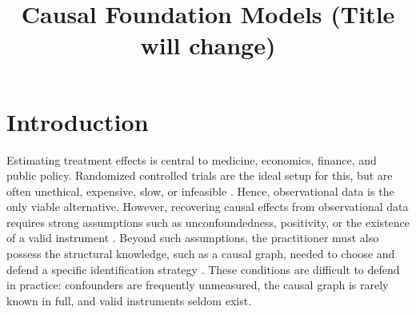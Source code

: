 \documentclass[11pt]{article}
\title{Causal Foundation Models (Title will change)}
\begin{document}
\maketitle

\section{Introduction}





Estimating treatment effects is central to medicine, economics, finance, and public policy. Randomized controlled trials are the ideal setup for this, but are often unethical, expensive, slow, or infeasible \citep{hernan2020}. Hence, observational data is the only viable alternative. However, recovering causal effects from observational data requires strong assumptions such as unconfoundedness, positivity, or the existence of a valid instrument \citep{hernan2020, pearl2009, chernozhukov2018, wager2018}. Beyond such assumptions, the practitioner must also possess the structural knowledge, such as a causal graph, needed to choose and defend a specific identification strategy \citep{spirtes2000}. These conditions are difficult to defend in practice: confounders are frequently unmeasured, the causal graph is rarely known in full, and valid instruments seldom exist.
\end{document}
